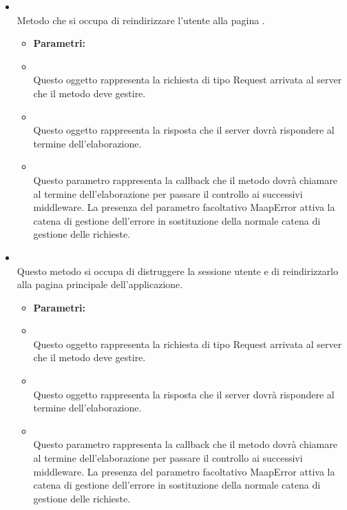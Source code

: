 \begin{itemize}
\item[] \textbf{} \\ Metodo che si occupa di reindirizzare l'utente alla pagina .
\begin{itemize}\addtolength{\itemsep}{-0.5\baselineskip}
\item[] \textbf{Parametri:}
\item[]  \\ Questo oggetto rappresenta la richiesta di tipo Request arrivata al server che il metodo deve gestire.
\item[]  \\ Questo oggetto rappresenta la risposta che il server dovrà rispondere al termine dell'elaborazione.
\item[]  \\ Questo parametro rappresenta la callback che il metodo dovrà chiamare al termine dell'elaborazione per passare il controllo ai successivi middleware. La presenza del parametro facoltativo MaapError attiva la catena di gestione dell'errore in sostituzione della normale catena di gestione delle richieste.
\end{itemize}
\item[] \textbf{} \\ Questo metodo si occupa di distruggere la sessione utente e di reindirizzarlo alla pagina principale dell'applicazione.
\begin{itemize}\addtolength{\itemsep}{-0.5\baselineskip}
\item[] \textbf{Parametri:}
\item[]  \\ Questo oggetto rappresenta la richiesta di tipo Request arrivata al server che il metodo deve gestire.
\item[]  \\ Questo oggetto rappresenta la risposta che il server dovrà rispondere al termine dell'elaborazione.
\item[]  \\ Questo parametro rappresenta la callback che il metodo dovrà chiamare al termine dell'elaborazione per passare il controllo ai successivi middleware. La presenza del parametro facoltativo MaapError attiva la catena di gestione dell'errore in sostituzione della normale catena di gestione delle richieste.

\end{itemize}
\end{itemize}
